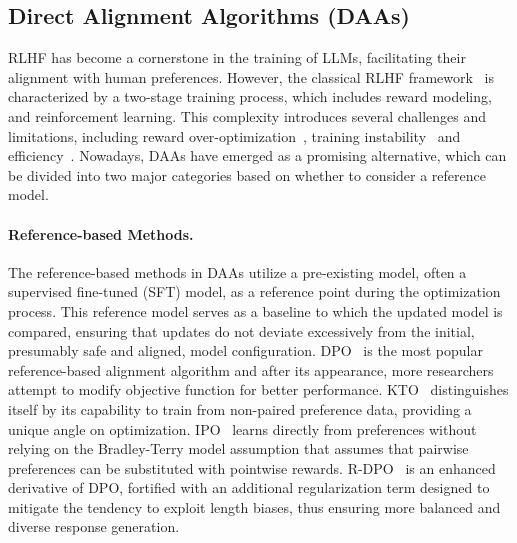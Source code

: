 \subsection{Direct Alignment Algorithms (DAAs)}
RLHF has become a cornerstone in the training of LLMs, facilitating their alignment with human preferences. However, the classical RLHF framework~\citep{Ouyang2022TrainingLM} is characterized by a two-stage training process, which includes reward modeling, and reinforcement learning. This complexity introduces several challenges and limitations, including reward over-optimization~\citep{Gao2022ScalingLF,Dubois2023Alice,wang-etal-2024-hybrid}, training instability~\citep{Wu2023PairwisePP} and efficiency~\citep{wang2024esrl}. 
Nowadays, DAAs have emerged as a promising alternative, which can be divided into two major categories based on whether to consider a reference model.

\vspace{-0.25cm}
\paragraph{Reference-based Methods.}
The reference-based methods in DAAs utilize a pre-existing model, often a supervised fine-tuned (SFT) model, as a reference point during the optimization process. This reference model serves as a baseline to which the updated model is compared, ensuring that updates do not deviate excessively from the initial, presumably safe and aligned, model configuration. DPO~\citep{Rafailov2023DirectPO} is the most popular reference-based alignment algorithm and after its appearance, more researchers attempt to modify objective function for better performance. KTO~\citep{Ethayarajh2024KTOMA} distinguishes itself by its capability to train from non-paired preference data, providing a unique angle on optimization. IPO~\citep{Azar2023AGT} learns directly from preferences without relying on the Bradley-Terry model assumption that assumes that pairwise preferences can be substituted with pointwise rewards. R-DPO~\citep{Park2024DisentanglingLF} is an enhanced derivative of DPO, fortified with an additional regularization term designed to mitigate the tendency to exploit length biases, thus ensuring more balanced and diverse response generation.

\vspace{-0.25cm}
